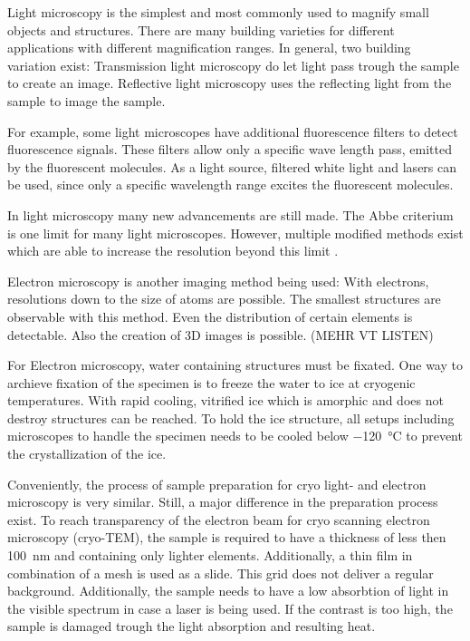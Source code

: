

Light microscopy is the simplest and most commonly used to magnify small objects and structures. There are many building varieties for different applications with different magnification ranges. In general, two building variation exist: Transmission light microscopy do let light pass trough the sample to create an image. Reflective light microscopy uses the reflecting light from the sample to image the sample. 

For example, some light microscopes have additional fluorescence filters to detect fluorescence signals. These filters allow only a specific wave length pass, emitted by the fluorescent molecules. As a light source, filtered white light and lasers can be used, since only a specific wavelength range excites the fluorescent molecules.

In light microscopy many new advancements are still made. The Abbe criterium is one limit for many light microscopes. However, multiple modified methods exist which are able to increase the resolution	 beyond this limit \cite{Heintzmann.2006}.

Electron microscopy is another imaging method being used: With electrons, resolutions down to the size of atoms are possible. The smallest structures are observable with this method. Even the distribution of certain elements is detectable. Also the creation of 3D images is possible. (MEHR VT LISTEN)

For Electron microscopy, water containing structures must be fixated. One way to archieve fixation of the specimen is to freeze the water to ice at cryogenic temperatures. With rapid cooling, vitrified ice which is amorphic and does not destroy structures can be reached. To hold the ice structure, all setups including microscopes to handle the specimen needs to be cooled below \SI{-120}{\degreeCelsius} to prevent the crystallization of the ice.

Conveniently, the process of sample preparation for cryo light- and electron microscopy is very similar. Still, a major difference in the preparation process exist. To reach transparency of the electron beam for cryo scanning electron microscopy (cryo-TEM), the sample is required to have a thickness of less then \SI{100}{\nano\meter} and containing only lighter elements. Additionally, a thin film in combination of a mesh is used as a slide. This grid does not deliver a regular background. Additionally, the sample needs to have a low absorbtion of light in the visible spectrum in case a laser is being used. If the contrast is too high, the sample is damaged trough the light absorption and resulting heat.

